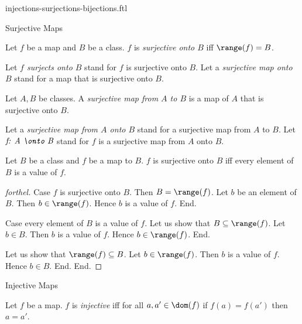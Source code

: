 \documentclass{naproche-library}
\begin{document}
\begin{smodule}[title={Injective, Surjective and Bijective Maps}]{injections-surjections-bijections.ftl}

\begin{sfragment}{Surjective Maps}
  \begin{definition}[forthel,id=FOUNDATIONS_08_8681187805495296]
    Let $f$ be a map and $B$ be a class.
    $f$ is \emph{surjective onto $B$} iff $\range(f) = B$.

    Let \emph{$f$ surjects onto $B$} stand for $f$ is surjective onto $B$.
    Let a \emph{surjective map onto $B$} stand for a map that is surjective onto $B$.
  \end{definition}

  \begin{definition}[forthel,id=FOUNDATIONS_08_4195237329108992]
    Let $A, B$ be classes.
    A \emph{surjective map from $A$ to $B$} is a map of $A$ that is surjective onto $B$.

    Let a \emph{surjective map from $A$ onto $B$} stand for a surjective map from $A$ to $B$.
    Let $\emph{f: A \onto B}$ stand for $f$ is a surjective map from $A$ onto $B$.
  \end{definition}

  \begin{proposition}[forthel,id=FOUNDATIONS_08_1974205941809152]
    Let $B$ be a class and $f$ be a map to $B$.
    $f$ is surjective onto $B$ iff every element of $B$ is a value of $f$.
  \end{proposition}
  \begin{proof}[forthel]
    Case $f$ is surjective onto $B$.
      Then $B = \range(f)$.
      Let $b$ be an element of $B$.
      Then $b \in \range(f)$.
      Hence $b$ is a value of $f$.
    End.

    Case every element of $B$ is a value of $f$.
      Let us show that $B \subseteq \range(f)$.
        Let $b \in B$.
        Then $b$ is a value of $f$.
        Hence $b \in \range(f)$.
      End.

      Let us show that $\range(f) \subseteq B$.
        Let $b \in \range(f)$.
        Then $b$ is a value of $f$.
        Hence $b \in B$.
      End.
    End.
  \end{proof}
\end{sfragment}

\begin{sfragment}{Injective Maps}
  \begin{definition}[forthel,id=FOUNDATIONS_08_605931408719872]
    Let $f$ be a map.
    $f$ is \emph{injective} iff for all $a, a' \in \dom(f)$ if $f(a) = f(a')$ then $a = a'$.


\end{definition}
\end{sfragment}
\end{smodule}
\end{document}
